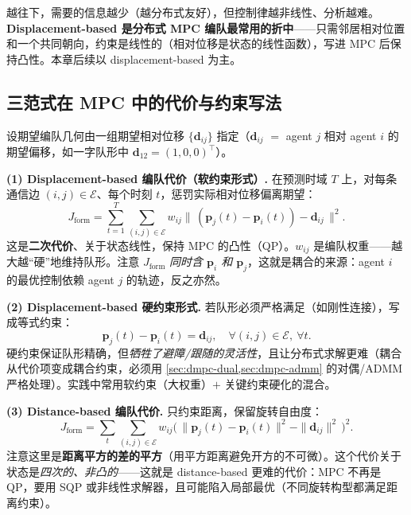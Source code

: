 \noindent 越往下，需要的信息越少（越分布式友好），但控制律越非线性、分析越难。\textbf{Displacement-based 是分布式 MPC 编队最常用的折中}——只需邻居相对位置和一个共同朝向，约束是线性的（相对位移是状态的线性函数），写进 MPC 后保持凸性。本章后续以 displacement-based 为主。

\subsection{三范式在 MPC 中的代价与约束写法}
\label{sec:dmpc-three-in-mpc}

设期望编队几何由一组期望相对位移 $\{\mathbf{d}_{ij}\}$ 指定（$\mathbf{d}_{ij}$ $=$ agent $j$ 相对 agent $i$ 的期望偏移，如一字队形中 $\mathbf{d}_{12}=(1,0,0)^\top$）。

\textbf{(1) Displacement-based 编队代价（软约束形式）.} 在预测时域 $T$ 上，对每条通信边 $(i,j)\in\mathcal{E}$、每个时刻 $t$，惩罚实际相对位移偏离期望：
\begin{equation}
  J_{\text{form}}=\sum_{t=1}^{T}\sum_{(i,j)\in\mathcal{E}} w_{ij}\big\|\,(\mathbf{p}_j(t)-\mathbf{p}_i(t)) - \mathbf{d}_{ij}\,\big\|^2.
  \label{eq:dmpc-disp-soft}
\end{equation}
这是\textbf{二次代价}、关于状态线性，保持 MPC 的凸性（QP）。$w_{ij}$ 是编队权重——越大越“硬”地维持队形。注意 $J_{\text{form}}$ \emph{同时含 $\mathbf{p}_i$ 和 $\mathbf{p}_j$}，这就是耦合的来源：agent $i$ 的最优控制依赖 agent $j$ 的轨迹，反之亦然。

\textbf{(2) Displacement-based 硬约束形式.} 若队形必须严格满足（如刚性连接），写成等式约束：
\begin{equation}
  \mathbf{p}_j(t)-\mathbf{p}_i(t) = \mathbf{d}_{ij},\quad \forall (i,j)\in\mathcal{E},\ \forall t.
  \label{eq:dmpc-disp-hard}
\end{equation}
硬约束保证队形精确，但\emph{牺牲了避障/跟随的灵活性}，且让分布式求解更难（耦合从代价项变成耦合约束，必须用 \cref{sec:dmpc-dual,sec:dmpc-admm} 的对偶/ADMM 严格处理）。实践中常用软约束（大权重）$+$ 关键约束硬化的混合。

\textbf{(3) Distance-based 编队代价.} 只约束距离，保留旋转自由度：
\begin{equation}
  J_{\text{form}}=\sum_{t}\sum_{(i,j)\in\mathcal{E}} w_{ij}\big(\,\|\mathbf{p}_j(t)-\mathbf{p}_i(t)\|^2 - \|\mathbf{d}_{ij}\|^2\,\big)^2.
  \label{eq:dmpc-dist}
\end{equation}
注意这里是\textbf{距离平方的差的平方}（用平方距离避免开方的不可微）。这个代价关于状态是\emph{四次的、非凸的}——这就是 distance-based 更难的代价：MPC 不再是 QP，要用 SQP 或非线性求解器，且可能陷入局部最优（不同旋转构型都满足距离约束）。

